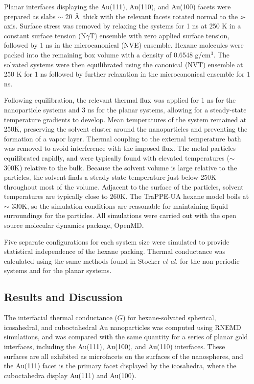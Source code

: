 Planar interfaces displaying the Au(111), Au(110), and Au(100) facets
were prepared as slabs $\sim$ 20 \AA\ thick with the relevant facets
rotated normal to the $z$-axis. Surface stress was removed by relaxing
the systems for 1 ns at 250 K in a constant surface tension
(N\(\gamma\)T) ensemble with zero applied surface tension, followed by
1 ns in the microcanonical (NVE) ensemble.  Hexane molecules were
packed into the remaining box volume with a density of 0.6548
g/cm$^3$. The solvated systems were then equilibrated using the
canonical (NVT) ensemble at 250 K for 1 ns followed by further
relaxation in the microcanonical ensemble for 1 ns.

Following equilibration, the relevant thermal flux was applied for 1
ns for the nanoparticle systems and 3 ns for the planar systems,
allowing for a steady-state temperature gradients to develop. Mean
temperatures of the system remained at 250K, preserving the solvent
cluster around the nanoparticles and preventing the formation of a
vapor layer. Thermal coupling to the external temperature bath was
removed to avoid interference with the imposed flux. The metal
particles equilibrated rapidly, and were typically found with elevated
temperatures ($\sim$300K) relative to the bulk. Because the solvent
volume is large relative to the particles, the solvent finds a steady
state temperature just below 250K throughout most of the
volume. Adjacent to the surface of the particles, solvent temperatures
are typically close to 260K. The TraPPE-UA hexane model boils at
$\sim$ 330K, so the simulation conditions are reasonable for
maintaining liquid surroundings for the particles.  All simulations
were carried out with the open source molecular dynamics package,
OpenMD.\cite{openmd,OOPSE}

Five separate configurations for each system size were simulated to
provide statistical independence of the hexane packing.  Thermal
conductance was calculated using the same methods found in Stocker
\textit{et al.}\cite{Stocker2016} for the non-periodic systems and for
the planar systems.\cite{Stocker:2013cl}

\subsection{Results and Discussion}
The interfacial thermal conductance ($G$) for hexane-solvated
spherical, icosahedral, and cuboctahedral Au nanoparticles was
computed using RNEMD simulations, and was compared with the same
quantity for a series of planar gold interfaces, including the
Au(111), Au(100), and Au(110) interfaces.  These surfaces are all
exhibited as microfacets on the surfaces of the nanospheres, and the
Au(111) facet is the primary facet displayed by the icosahedra,
where the cuboctahedra display Au(111) and Au(100).

